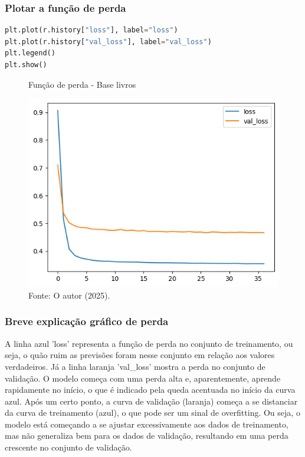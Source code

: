 \subsubsection*{Plotar a função de perda}
\begin{lstlisting}[language=Python, style=input]
plt.plot(r.history["loss"], label="loss")
plt.plot(r.history["val_loss"], label="val_loss")
plt.legend()
plt.show()
\end{lstlisting}
\begin{figure}[H]
\centering
\caption{Função de perda - Base livros}
\includegraphics[width=.8\linewidth]{apendices/fig/13_IAA012_9.png}
\caption*{Fonte: O autor (2025).}
\end{figure}
\subsubsection*{Breve explicação gráfico de perda}
A linha azul 'loss' representa a função de perda no conjunto de treinamento, ou seja, o quão ruim as previsões foram nesse conjunto em relação aos valores verdadeiros. Já a linha laranja 'val\_loss' mostra a perda no conjunto de validação. O modelo começa com uma perda alta e, aparentemente, aprende rapidamente no início, o que é indicado pela queda acentuada no início da curva azul. Após um certo ponto, a curva de validação (laranja) começa a se distanciar da curva de treinamento (azul), o que pode ser um sinal de overfitting. Ou seja, o modelo está começando a se ajustar excessivamente aos dados de treinamento, mas não generaliza bem para os dados de validação, resultando em uma perda crescente no conjunto de validação.
